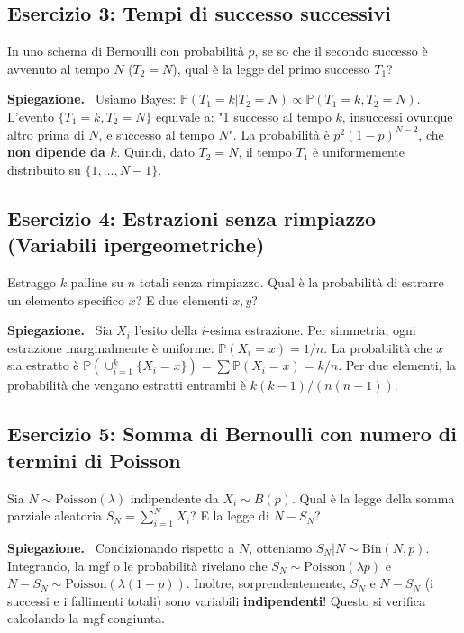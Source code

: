 \documentclass[11pt, a4paper]{report}
\theoremstyle{plain}
\theoremstyle{definition}
\theoremstyle{remark}
\newenvironment{spiegazione}[1][Spiegazione]
{\begin{mdframed}[backgroundcolor=green!5, linecolor=green!50, linewidth=2pt, topline=false, rightline=false, bottomline=false]
\textbf{\textsf{#1.}}\ }
{\end{mdframed}}
\newcommand{\PP}{\mathbb{P}}
\newcommand{\1}{\mathbf{1}}
\begin{document}
\subsection*{Esercizio 3: Tempi di successo successivi}
In uno schema di Bernoulli con probabilità $p$, se so che il secondo successo è avvenuto al tempo $N$ ($T_2 = N$), qual è la legge del primo successo $T_1$?
\begin{spiegazione}
Usiamo Bayes: $\PP(T_1 = k | T_2 = N) \propto \PP(T_1 = k, T_2 = N)$.
L'evento $\{T_1 = k, T_2 = N\}$ equivale a: "1 successo al tempo $k$, insuccessi ovunque altro prima di $N$, e successo al tempo $N$". La probabilità è $p^2 (1-p)^{N-2}$, che \textbf{non dipende da $k$}.
Quindi, dato $T_2=N$, il tempo $T_1$ è uniformemente distribuito su $\{1, \dots, N-1\}$.
\end{spiegazione}

\subsection*{Esercizio 4: Estrazioni senza rimpiazzo (Variabili ipergeometriche)}
Estraggo $k$ palline su $n$ totali senza rimpiazzo. Qual è la probabilità di estrarre un elemento specifico $x$? E due elementi $x, y$?
\begin{spiegazione}
Sia $X_i$ l'esito della $i$-esima estrazione. Per simmetria, ogni estrazione marginalmente è uniforme: $\PP(X_i = x) = 1/n$.
La probabilità che $x$ sia estratto è $\PP(\cup_{i=1}^k \{X_i=x\}) = \sum \PP(X_i=x) = k/n$.
Per due elementi, la probabilità che vengano estratti entrambi è $k(k-1)/(n(n-1))$.
\end{spiegazione}

\subsection*{Esercizio 5: Somma di Bernoulli con numero di termini di Poisson}
Sia $N \sim \text{Poisson}(\lambda)$ indipendente da $X_i \sim B(p)$. Qual è la legge della somma parziale aleatoria $S_N = \sum_{i=1}^N X_i$? E la legge di $N - S_N$?
\begin{spiegazione}
Condizionando rispetto a $N$, otteniamo $S_N|N \sim \text{Bin}(N, p)$. Integrando, la mgf o le probabilità rivelano che \textbf{$S_N \sim \text{Poisson}(\lambda p)$} e \textbf{$N - S_N \sim \text{Poisson}(\lambda(1-p))$}.
Inoltre, sorprendentemente, $S_N$ e $N-S_N$ (i successi e i fallimenti totali) sono variabili \textbf{indipendenti}! Questo si verifica calcolando la mgf congiunta.
\end{spiegazione}
\end{document}
